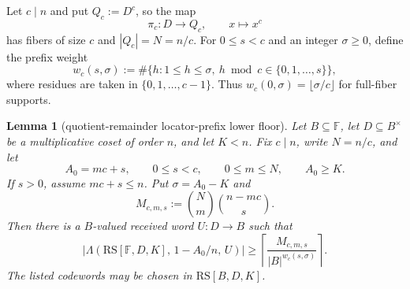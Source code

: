 \documentclass[11pt]{article}
\newtheorem{lemma}[lemma]{Lemma}
\theoremstyle{definition}
\theoremstyle{remark}
\newcommand{\F}{\mathbb{F}}
\newcommand{\B}{B}
\newcommand{\RS}{\mathrm{RS}}
\newcommand{\Lst}{\Lambda}
\begin{document}
Let $c\mid n$ and put $Q_c:=D^c$, so the map
\[
        \pi_c:D\to Q_c,\qquad x\mapsto x^c
\]
has fibers of size $c$ and $|Q_c|=N=n/c$.  For $0\le s<c$ and an integer
$\sigma\ge0$, define the prefix weight
\[
        w_c(s,\sigma)
        :=\#\{h:1\le h\le\sigma,
              \ h\bmod c\in\{0,1,\ldots,s\}\},
\]
where residues are taken in $\{0,1,\ldots,c-1\}$.  Thus
$w_c(0,\sigma)=\lfloor \sigma/c\rfloor$ for full-fiber supports.

\begin{lemma}[quotient-remainder locator-prefix lower floor]
\label{lem:quotient-remainder-prefix}
Let $\B\subseteq\F$, let $D\subseteq\B^\times$ be a multiplicative coset of
order $n$, and let $K<n$.  Fix $c\mid n$, write $N=n/c$, and let
\[
        A_0=mc+s,
        \qquad 0\le s<c,
        \qquad 0\le m\le N,
        \qquad A_0\ge K .
\]
If $s>0$, assume $mc+s\le n$.  Put $\sigma=A_0-K$ and
\[
        M_{c,m,s}:=\binom Nm\binom{n-mc}{s}.
\]
Then there is a $\B$-valued received word $U:D\to\B$ such that
\[
        \bigl|\Lst(\RS[\F,D,K],\,1-A_0/n,\,U)\bigr|
        \ge
        \left\lceil \frac{M_{c,m,s}}{|\B|^{w_c(s,\sigma)}}\right\rceil .
\]
The listed codewords may be chosen in $\RS[\B,D,K]$.
\end{lemma}
\end{document}
